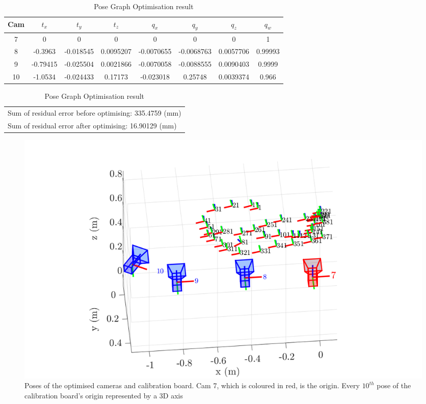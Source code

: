 \begin{table}[ht]
    \caption{\label{tab:result}Pose Graph Optimisation result}
    \begin{tabular}{ |c|c|c|c|c|c|c|c| }
     \hline
    Cam & $t_{x}$ & $t_{y}$ & $t_{z}$ & $q_{x}$ & $q_{y}$ & $q_{z}$ & $q_{w}$ \\
     \hline
    7  & 0 & 0 & 0 & 0 & 0 & 0 & 1 \\ 
    8  & -0.3963  & -0.018545 & 0.0095207 & -0.0070655 & -0.0068763 & 0.0057706 & 0.99993 \\
    9  & -0.79415 & -0.025504 & 0.0021866 & -0.0070058 & -0.0088555 & 0.0090403 & 0.9999  \\ 
    10 & -1.0534  & -0.024433 & 0.17173   & -0.023018  & 0.25748    & 0.0039374 & 0.966   \\ 
     \hline
    \end{tabular}
    \begin{tabular}{|l|}
        Sum of residual error before optimising: 335.4759 (mm) \\
        Sum of residual error after optimising: 16.90129 (mm) \\
        \hline
    \end{tabular}
\end{table}

\begin{figure}[ht]
\centering
\includegraphics[width=1\textwidth]{Images/optimised_pose_cameras.png}
\caption{\centering Poses of the optimised cameras and calibration board. Cam 7, which is coloured in red, is the origin. Every $10^{th}$ pose of the calibration board's origin represented by a 3D axis}
\end{figure}

